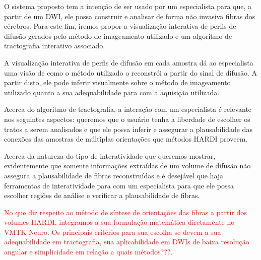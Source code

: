 \documentclass[
    12pt,                %
    oneside,            %
    a4paper,            %
    english,            %
    french,                %
    spanish,            %
    brazil                %
    ]{abntex2}
\begin{document}
O sistema proposto tem a intenção de ser usado por um especialista para que, a partir de um DWI, ele possa construir e analisar de forma não invasiva fibras dos cérebros. Para este fim, iremos propor a visualização interativa de perfis de difusão gerados pelo método de imageamento utilizado e um algoritmo de tractografia interativo associado.

A visualização interativa de perfis de difusão em cada amostra dá ao especialista uma visão de como o método utilizado o reconstrói a partir do sinal de difusão. A partir disto, ele pode inferir visualmente sobre o método de imageamento utilizado quanto a sua adequabilidade para com a aquisição utilizada.

Acerca do algoritmo de tractografia, a interação com um especialista é relevante nos seguintes aspectos: queremos que o usuário tenha a liberdade de escolher os tratos a serem analisados e que ele possa inferir e assegurar a plausabilidade das conexões das amostras de múltiplas orientações que métodos HARDI proveem.

Acerca da natureza do tipo de interatividade que queremos mostrar, evidentemente que somente informações extraídas de um volume de difusão não assegura a plausabilidade de fibras reconstruídas e é desejável que haja ferramentas de interatividade para com um especialista para que ele possa escolher regiões de análise e verificar a plausabilidade de fibras.






\textcolor{red}{No que diz respeito ao método de síntese de orientações das fibras a partir dos volumes HARDI, integramos a sua formulação matemática diretamente no VMTK-Neuro. Os principais critérios para sua escolha se devem a sua adequabilidade em tractografia, sua aplicabilidade em DWIs de baixa resolução angular e simplicidade em relação a quais métodos???.}
\end{document}
